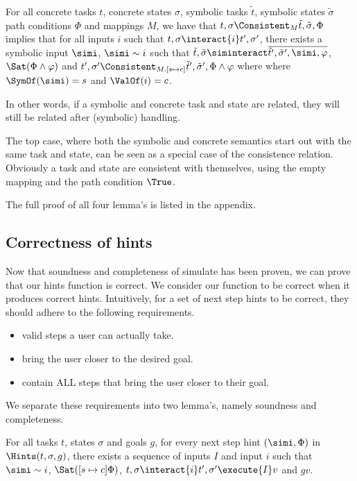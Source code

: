 \begin{lemma}
  \label{lem:completedriving}
  For all concrete tasks $t$, concrete states $\sigma$, symbolic tasks $\tilde{t}$, symbolic states $\tilde{\sigma}$ path conditions $\Phi$ and mappings $M$,
  we have that $t,\sigma\Consistent_{M}\tilde{t},\tilde{\sigma},\Phi$ implies
  that for all inputs $i$ such that $t,\sigma\interact{i}t',\sigma'$,
  there exists a symbolic input $\simi$, $\simi\sim i$ such that
  $\tilde{t},\tilde{\sigma}\siminteract\overline{\tilde{t}',\tilde{\sigma}',\simi,\phi}$, $\Sat(\Phi\land\phi)$ and $t',\sigma'\Consistent_{M.[s\mapsto c]}\tilde{t}',\tilde{\sigma}',\Phi\land\phi$ where where $\SymOf(\simi)=s$ and $\ValOf(i)=c$.
\end{lemma}

In other words, if a symbolic and concrete task and state are related, they will still be related after (symbolic) handling.

The top case, where both the symbolic and concrete semantics start out with the same task and state, can be seen as a special case of the consistence relation.
Obviously a task and state are consistent with themselves, using the empty mapping and the path condition $\True$.

The full proof of all four lemma's is listed in the appendix.


\subsection{Correctness of hints}

Now that soundness and completeness of simulate has been proven, we can prove that our hints function is correct.
We consider our function to be correct when it produces correct hints.
Intuitively, for a set of next step hints to be correct, they should adhere to the following requirements.

\begin{itemize}
  \item valid steps a user can actually take.
  \item bring the user closer to the desired goal.
  \item contain ALL steps that bring the user closer to their goal.
\end{itemize}

We separate these requirements into two lemma's, namely soundness and completeness.

\begin{theorem}
  \label{thm:soundhint}

For all tasks $t$, states $\sigma$ and goals $g$,
for every next step hint $(\simi,\Phi)$ in $\Hints(t,\sigma,g)$,
there exists a sequence of inputs $I$ and input $i$ such that $\simi\sim i$,
$\Sat([s\mapsto c]\Phi)$, $t,\sigma\interact{i} t',\sigma'\execute{I} v$ and $gv$.
\end{theorem}

